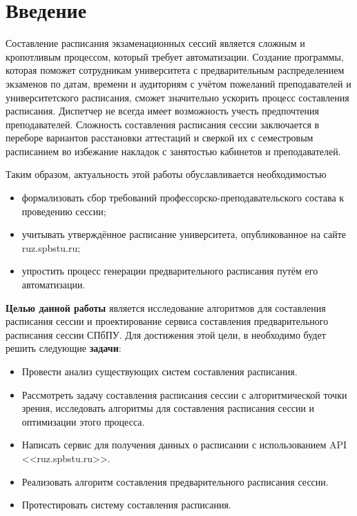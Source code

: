 \chapter*{Введение} %

Составление расписания экзаменационных сессий является сложным и кропотливым процессом, который требует автоматизации. Создание программы, которая поможет сотрудникам университета с предварительным распределением экзаменов по датам, времени и аудиториям с учётом пожеланий преподавателей и университетского расписания, сможет значительно ускорить процесс составления расписания. Диспетчер не всегда имеет возможность учесть предпочтения преподавателей.
Сложность составления расписания сессии заключается в переборе вариантов расстановки аттестаций и сверкой их с семестровым расписанием во избежание накладок с занятостью кабинетов и преподавателей. 

Таким образом, актуальность этой работы обуславливается необходимостью
\begin{itemize}
	\item формализовать сбор требований профессорско-преподавательского состава к проведению сессии;
	\item учитывать утверждённое расписание университета, опубликованное на сайте ruz.spbstu.ru;
	\item упростить процесс генерации предварительного расписания путём его автоматизации.
\end{itemize}

\textbf{Целью данной работы} является исследование алгоритмов для составления расписания сессии и проектирование сервиса составления предварительного расписания сессии СПбПУ.
Для достижения этой цели, в необходимо будет решить следующие \textbf{задачи}:

\begin{itemize}
	\item Провести анализ существующих систем составления расписания.
	\item Рассмотреть задачу составления расписания сессии с алгоритмической точки зрения, исследовать алгоритмы для составления расписания сессии и оптимизации этого процесса.
	\item Написать сервис для получения данных о расписании с использованием API <<ruz.spbstu.ru>>. %
	\item Реализовать алгоритм составления предварительного расписания сессии. 
	\item Протестировать систему составления расписания.
\end{itemize}
